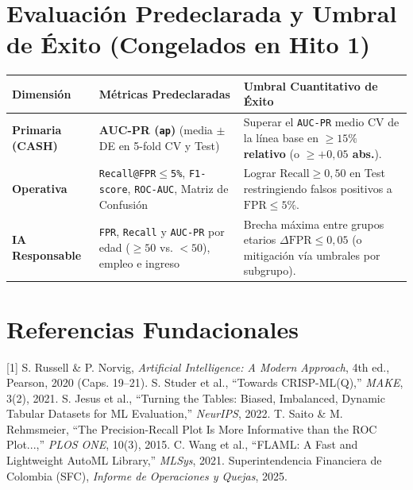 \documentclass[9pt,letterpaper]{article}
\begin{document}
\section{Evaluación Predeclarada y Umbral de Éxito (Congelados en Hito 1)}
\vspace{1pt}
{\footnotesize
\begin{tabularx}{\textwidth}{@{}l X X@{}}
\toprule
\textbf{Dimensión} & \textbf{Métricas Predeclaradas} & \textbf{Umbral Cuantitativo de Éxito} \\
\midrule
\textbf{Primaria (CASH)} & \textbf{AUC-PR (\texttt{ap})} (media $\pm$ DE en 5-fold CV y Test) & Superar el \texttt{AUC-PR} medio CV de la línea base en \textbf{$\ge 15\%$ relativo} (o \textbf{$\ge +0,05$ abs.}). \\
\textbf{Operativa} & \texttt{Recall@FPR$\le$5\%}, \texttt{F1-score}, \texttt{ROC-AUC}, Matriz de Confusión & Lograr \textbf{$\text{Recall} \ge 0,50$} en Test restringiendo falsos positivos a \textbf{$\text{FPR} \le 5\%$}. \\
\textbf{IA Responsable} & \texttt{FPR}, \texttt{Recall} y \texttt{AUC-PR} por edad ($\ge 50$ vs. $<50$), empleo e ingreso & Brecha máxima entre grupos etarios \textbf{$\Delta\text{FPR} \le 0,05$} (o mitigación vía umbrales por subgrupo). \\
\bottomrule
\end{tabularx}
}

\section{Referencias Fundacionales}
{\scriptsize
[1] S. Russell \& P. Norvig, \textit{Artificial Intelligence: A Modern Approach}, 4th ed., Pearson, 2020 (Caps. 19--21). \quad
[2] S. Studer et al., ``Towards CRISP-ML(Q),'' \textit{MAKE}, 3(2), 2021. \quad
[3] S. Jesus et al., ``Turning the Tables: Biased, Imbalanced, Dynamic Tabular Datasets for ML Evaluation,'' \textit{NeurIPS}, 2022. \quad
[4] T. Saito \& M. Rehmsmeier, ``The Precision-Recall Plot Is More Informative than the ROC Plot...,'' \textit{PLOS ONE}, 10(3), 2015. \quad
[5] C. Wang et al., ``FLAML: A Fast and Lightweight AutoML Library,'' \textit{MLSys}, 2021. \quad
[6] Superintendencia Financiera de Colombia (SFC), \textit{Informe de Operaciones y Quejas}, 2025.
}
\end{document}
